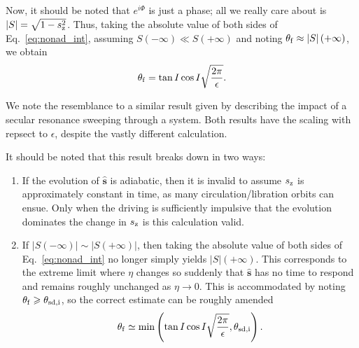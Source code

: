 \documentclass[
        fleqn,
        usenatbib,
        referee,
    ]{mnras}
\newcommand*{\abs}[1]{\left|#1\right|}
\newcommand*{\bm}[1]{\boldsymbol{\mathbf{#1}}}
\newcommand*{\uv}[1]{\hat{\bm{#1}}}
\newcommand*{\p}[1]{\left(#1\right)}
\begin{document}
Now, it should be noted that $e^{i\Phi}$ is just a phase; all we really care
about is $\abs{S} = \sqrt{1 - s_{\rm z}^2}$. Thus, taking the absolute value of both
sides of Eq.~\eqref{eq:nonad_int}, assuming $S\p{-\infty} \ll S\p{+\infty}$ and
noting $\theta_{\rm f} \approx \abs{S}(+\infty)$, we obtain
\begin{equation}
    \theta_{\rm f} = \tan I\cos I\sqrt{\frac{2\pi}{\epsilon}}.
        \label{eq:nonad_dong}
\end{equation}

We note the resemblance to a similar result given by \citet{malhotra_calc}
describing the impact of a secular resonance sweeping through a system. Both
results have the scaling with repsect to $\epsilon$, despite the vastly
different calculation.

It should be noted that this result breaks down in two ways:
\begin{enumerate}
    \item If the evolution of $\uv{s}$ is adiabatic, then it is invalid to
        assume $s_{\rm z}$ is approximately constant in time, as many
        circulation/libration orbits can ensue. Only when the driving is
        sufficiently impulsive that the evolution dominates the change in
        $s_{\rm z}$
        is this calculation valid.

    \item If $\abs{S\p{-\infty}} \sim \abs{S\p{+\infty}}$, then taking the
        absolute value of both sides of Eq.~\eqref{eq:nonad_int} no longer
        simply yields $\abs{S}\p{+\infty}$. This corresponds to the extreme
        limit where $\eta$ changes so suddenly that $\uv{s}$ has no time to
        respond and remains roughly unchanged as $\eta \to 0$. This is
        accommodated by noting $\theta_{\rm f} \geq \theta_{\rm sd, i}$, so the
        correct estimate can be roughly amended
        \begin{equation}
            \theta_{\rm f} \simeq \min\p{\tan I\cos
                I\sqrt{\frac{2\pi}{\epsilon}}, \theta_{\rm sd, i}}.
        \end{equation}
\end{enumerate}

\bsp
\label{lastpage} %
\end{document}
